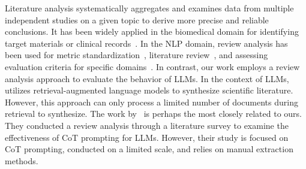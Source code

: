Literature analysis systematically aggregates and examines data from multiple independent studies on a given topic to derive more precise and reliable conclusions. 
It has been widely applied in the biomedical domain for identifying target materials or clinical records~\citep{bao2019using, yun2024automatically}. 
In the NLP domain, review analysis has been used for metric standardization~\citep{reiter2018structured}, literature review~\citep{santu2024prompting, du2024llms}, and assessing evaluation criteria for specific domains~\citep{ostheimer2023call}. 
In contrast, our work employs a review analysis approach to evaluate the behavior of LLMs.
In the context of LLMs, \citet{asai2024openscholar} utilizes retrieval-augmented language models to synthesize scientific literature. 
However, this approach can only process a limited number of documents during retrieval to synthesize.
The work by~\citet{sprague2024cot} is perhaps the most closely related to ours. 
They conducted a review analysis through a literature survey to examine the effectiveness of CoT prompting for LLMs. 
However, their study is focused on CoT prompting, conducted on a limited scale, and relies on manual extraction methods.






